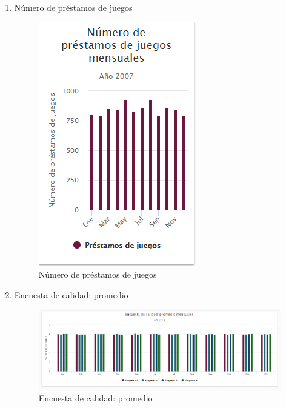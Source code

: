 \begin{itemize}
\begin{enumerate}
	\item Número de préstamos de juegos
	\begin{figure}[hbtp]
	\includegraphics[scale=0.5]{images/InterfazMovil/IUGS15_juegosMes.PNG}
	\caption{Número de préstamos de juegos}
	\end{figure}
	
	\item Encuesta de calidad: promedio
	\begin{figure}[hbtp]
	\includegraphics[scale=0.5]{images/Interfaz/IUGS15_encuestaCalidadMes.PNG}
	\caption{Encuesta de calidad: promedio}
	\end{figure}
	

\end{enumerate}
\end{itemize}
